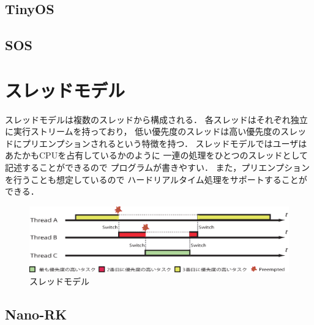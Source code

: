 \subsection{TinyOS}



\subsection{SOS}


\section{スレッドモデル}
スレッドモデルは複数のスレッドから構成される．
各スレッドはそれぞれ独立に実行ストリームを持っており，
低い優先度のスレッドは高い優先度のスレッドにプリエンプションされるという特徴を持つ．
スレッドモデルではユーザはあたかもCPUを占有しているかのように
一連の処理をひとつのスレッドとして記述することができるので
プログラムが書きやすい．
また，プリエンプションを行うことも想定しているので
ハードリアルタイム処理をサポートすることができる．
\begin{figure}[htbp]
 \begin{center}
  \includegraphics[width=140mm]{./images/threads_model.eps}
 \end{center}
 \caption{スレッドモデル}
 \label{fig:threads_model}
\end{figure}


\subsection{Nano-RK}



